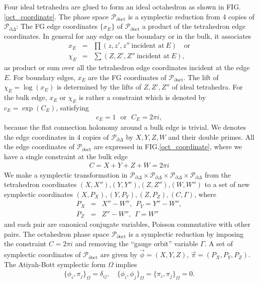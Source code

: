 \documentclass[aps,prd,notitlepage,nofootinbib,superscriptaddress,groupedaddress,twocolumn]{revtex4-1}
\def\be{\begin{eqnarray}}
\def\ee{\end{eqnarray}}
\newcommand{\calp}{\mathcal P}
\newcommand{\G}{\Gamma}
\renewcommand{\O}{\Omega}
\begin{document}
Four ideal tetrahedra are glued to form an ideal octahedron as shown in FIG.\ref{oct_coordinate}. The phase space $\calp_{\partial\mathrm{oct}}$ is a symplectic reduction from 4 copies of $\calp_{\partial\Delta}$: The FG edge coordinates $\{x_E\}$ of $\calp_{\partial\mathrm{oct}}$ a product of the tetrahedron edge coordinates. In general for any edge on the boundary or in the bulk, it associates \cite{DGV}
\be
x_E&=&\prod(z,z',z''\ \text{incident at}\ E)\quad\text{or}\nonumber\\
\chi_E&=&\sum(Z,Z',Z''\ \text{incident at}\ E),\label{edgesum}
\ee 
as product or sum over all the tetrahedron edge coordinates incident at the edge $E$. For boundary edges, $x_E$ are the FG coordinates of $\calp_{\partial\mathrm{oct}}$. The lift of $\chi_E=\log(x_E)$ is determined by the lifts of $Z,Z',Z''$ of ideal tetrahedra. For the bulk edge, $x_E$ or $\chi_E$ is rather a constraint which is denoted by $c_E=\exp(C_E)$, satisfying
\be
c_E=1\ \ \ \text{or}\ \ \ C_E=2\pi i, 
\ee
because the flat connection holonomy around a bulk edge is trivial. We denotes the edge coordinates in 4 copies of $\calp_{\partial\Delta}$ by $X,Y,Z,W$ and their double primes. All the edge coordinates of $\calp_{\partial\mathrm{oct}}$ are expressed in FIG.\ref{oct_coordinate}, where we have a single constraint at the bulk edge
\be
C=X+Y+Z+W=2\pi i\label{CXYZW}
\ee
We make a symplectic transformation in $\calp_{\partial\Delta}\times\calp_{\partial\Delta}\times \calp_{\partial\Delta}\times\calp_{\partial\Delta}$ from the tetrahedron coordinates $(X,X'')$,$(Y,Y'')$,$(Z,Z'')$,$(W,W'')$ to a set of new symplectic coordinates $(X,P_X),(Y,P_Y),(Z,P_Z),(C,\G)$, where
\be
P_X&=&X''-W'',\ \ P_Y=Y''-W'',\nonumber\\ 
P_Z&=&Z''-W'',\ \ \G=W''\label{PXYZW}
\ee
and each pair are canonical conjugate variables, Poisson commutative with other pairs. The octahedron phase space $\calp_{\partial\mathrm{oct}}$ is a symplectic reduction by imposing the constraint $C=2\pi i$ and removing the ``gauge orbit'' variable $\G$. A set of symplectic coordinates of $\calp_{\partial\mathrm{oct}}$ are given by $\vec{\phi}=(X,Y,Z)$, $\vec{\pi}=(P_X,P_Y,P_Z)$. The Atiyah-Bott symplectic form $\O$ implies 
\be
\{\phi_i,\pi_j\}_\O=\delta_{ij},\quad \{\phi_i,\phi_j\}_\O=\{\pi_i,\pi_j\}_\O=0.\label{octsymp}
\ee
\end{document}
